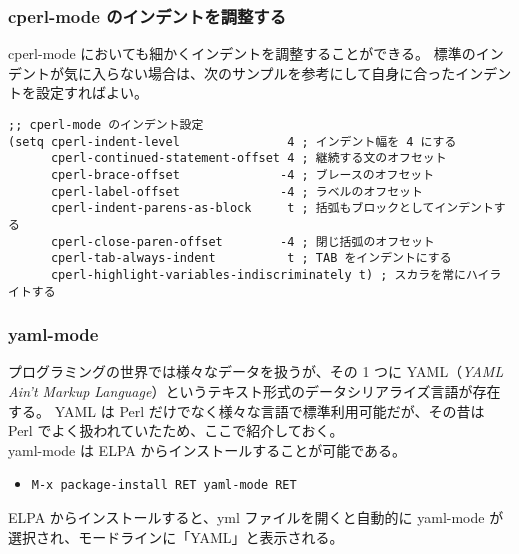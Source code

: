 \subsubsection{cperl-mode のインデントを調整する}
cperl-mode においても細かくインデントを調整することができる。
標準のインデントが気に入らない場合は、次のサンプルを参考にして自身に合ったインデントを設定すればよい。
\begin{mdframed}[roundcorner=0.50zw,leftmargin=3.00zw,rightmargin=3.00zw,skipabove=0.40zw,skipbelow=0.40zw,innertopmargin=4.00pt,innerbottommargin=4.00pt,innerleftmargin=5.00pt,innerrightmargin=5.00pt,linecolor=gray!020,linewidth=0.50pt,backgroundcolor=gray!20]
\begin{verbatim}
;; cperl-mode のインデント設定
(setq cperl-indent-level               4 ; インデント幅を 4 にする
      cperl-continued-statement-offset 4 ; 継続する文のオフセット
      cperl-brace-offset              -4 ; ブレースのオフセット
      cperl-label-offset              -4 ; ラベルのオフセット
      cperl-indent-parens-as-block     t ; 括弧もブロックとしてインデントする
      cperl-close-paren-offset        -4 ; 閉じ括弧のオフセット
      cperl-tab-always-indent          t ; TAB をインデントにする
      cperl-highlight-variables-indiscriminately t) ; スカラを常にハイライトする
\end{verbatim}
\end{mdframed}
\subsubsection{yaml-mode}
プログラミングの世界では様々なデータを扱うが、その 1 つに YAML（\emph{YAML Ain't Markup Language}）というテキスト形式のデータシリアライズ言語が存在する。
YAML は Perl だけでなく様々な言語で標準利用可能だが、その昔は Perl でよく扱われていたため、ここで紹介しておく。\\

yaml-mode は ELPA からインストールすることが可能である。
\begin{itemize}\setlength{\leftskip}{-1.00zw}%
\item[] \texttt{M-x package-install RET yaml-mode RET}
\end{itemize}
ELPA からインストールすると、yml ファイルを開くと自動的に yaml-mode が選択され、モードラインに「YAML」と表示される。
